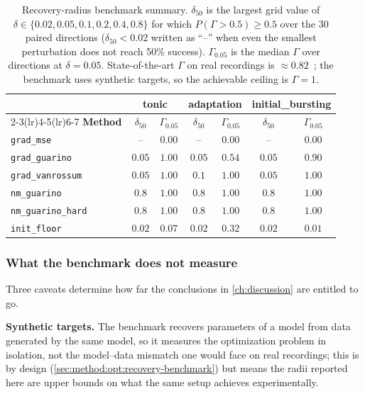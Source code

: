 \begin{table}[t]
\centering
\caption{Recovery-radius benchmark summary. $\delta_{50}$ is the largest grid value of $\delta\in\{0.02,0.05,0.1,0.2,0.4,0.8\}$ for which $P(\Gamma>0.5)\geq 0.5$ over the 30 paired directions ($\delta_{50} < 0.02$ written as ``--'' when even the smallest perturbation does not reach 50\% success). $\Gamma_{0.05}$ is the median $\Gamma$ over directions at $\delta=0.05$. State-of-the-art $\Gamma$ on real recordings is $\approx 0.82$~\cite{Jolivet2008}; the benchmark uses synthetic targets, so the achievable ceiling is $\Gamma=1$.}
\label{tab:results-summary}
\small
\begin{tabular}{lcccccc}
\toprule
& \multicolumn{2}{c}{\textbf{tonic}} & \multicolumn{2}{c}{\textbf{adaptation}} & \multicolumn{2}{c}{\textbf{initial\_bursting}} \\
\cmidrule(lr){2-3}\cmidrule(lr){4-5}\cmidrule(lr){6-7}
\textbf{Method} & $\delta_{50}$ & $\Gamma_{0.05}$ & $\delta_{50}$ & $\Gamma_{0.05}$ & $\delta_{50}$ & $\Gamma_{0.05}$ \\
\midrule
\texttt{grad\_mse}         & --     & $0.00$ & --     & $0.00$ & --     & $0.00$ \\
\texttt{grad\_guarino}     & $0.05$ & $1.00$ & $0.05$ & $0.54$ & $0.05$ & $0.90$ \\
\texttt{grad\_vanrossum}   & $0.05$ & $1.00$ & $0.1$  & $1.00$ & $0.05$ & $1.00$ \\
\texttt{nm\_guarino}       & $0.8$  & $1.00$ & $0.8$  & $1.00$ & $0.8$  & $1.00$ \\
\texttt{nm\_guarino\_hard} & $0.8$  & $1.00$ & $0.8$  & $1.00$ & $0.8$  & $1.00$ \\
\midrule
\texttt{init\_floor}       & $0.02$ & $0.07$ & $0.02$ & $0.32$ & $0.02$ & $0.01$ \\
\bottomrule
\end{tabular}
\end{table}

\subsubsection{What the benchmark does not measure}
Three caveats determine how far the conclusions in \cref{ch:discussion} are entitled to go.

\textbf{Synthetic targets.} The benchmark recovers parameters of a model from data generated by the same model, so it measures the optimization problem in isolation, not the model--data mismatch one would face on real recordings; this is by design (\cref{sec:method:opt:recovery-benchmark}) but means the radii reported here are upper bounds on what the same setup achieves experimentally.

